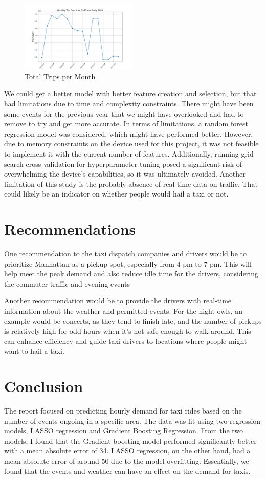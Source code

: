 \documentclass[11pt]{article}
\begin{document}
\begin{figure}[h]
    \includegraphics[width=0.5\textwidth]{plots/monthly_trips.png}
    \centering
    \caption{Total Trips per Month}
    \label{fig:trips}
\end{figure}

We could get a better model with better feature creation and selection, but that had limitations due to time and complexity constraints. There might have been some events for the previous year that we might have overlooked and had to remove to try and get more accurate. 
In terms of limitations, a random forest regression model was considered, which might have performed better. However, due to memory constraints on the device used for this project, it was not feasible to implement it with the current number of features. Additionally, running grid search cross-validation for hyperparameter tuning posed a significant risk of overwhelming the device's capabilities, so it was ultimately avoided.
Another limitation of this study is the probably absence of real-time data on traffic. That could likely be an indicator on whether people would hail a taxi or not. 


\section{Recommendations}
One recommendation to the taxi dispatch companies and drivers would be to prioritize Manhattan as a pickup spot, especially from 4 pm to 7 pm. This will help meet the peak demand and also reduce idle time for the drivers, considering the commuter traffic and evening events

Another recommendation would be to provide the drivers with real-time information about the weather and permitted events. For the night owls, an example would be concerts, as they tend to finish late, and the number of pickups is relatively high for odd hours when it's not safe enough to walk around. This can enhance efficiency and guide taxi drivers to locations where people might want to hail a taxi.

\section{Conclusion}
The report focused on predicting hourly demand for taxi rides based on the number of events ongoing in a specific area. The data was fit using two regression models, LASSO regression and Gradient Boosting Regression. From the two models, I found that the Gradient boosting model performed significantly better - with a mean absolute error of 34. LASSO regression, on the other hand, had a mean absolute error of around 50 due to the model overfitting. Essentially, we found that the events and weather can have an effect on the demand for taxis.
\end{document}
